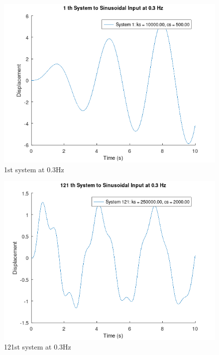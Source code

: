 \documentclass[11pt]{article}
\begin{document}
\begin{figure}[h]
    \centering
    \includegraphics[width=.9\linewidth]{ENG204-Assignment-2-Sinusoidal-f-0.3-1.png}
    \caption{1st system at 0.3Hz}
    \label{fig:1000hz}
\end{figure}

\begin{figure}[h]
    \centering
    \includegraphics[width=.9\linewidth]{ENG204-Assignment-2-Sinusoidal-f-0.3-121.png}
    \caption{121st system at 0.3Hz}
    \label{fig:1000hz}
\end{figure}
\end{document}
